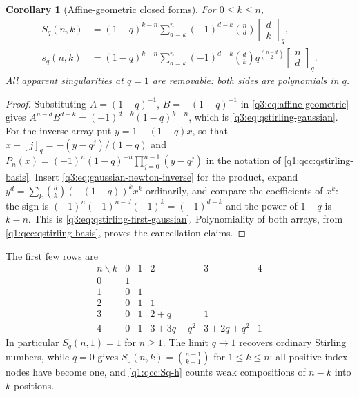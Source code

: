 \documentclass[11pt,a4paper,oneside,openany]{book}
\newtheorem{corollary}[theorem]{Corollary}
\theoremstyle{definition}
\theoremstyle{remark}
\newcommand{\GB}[3][q]{\begin{bmatrix}#2\\#3\end{bmatrix}_{#1}}
\begin{document}
\begin{corollary}[Affine-geometric closed forms]\label{q3:cor:qstirling-gaussian}
For \(0\le k\le n\),
\begin{align}
 S_q(n,k)&=(1-q)^{k-n}
       \sum_{d=k}^n(-1)^{d-k}\binom nd\GB dk,
 \label{q3:eq:qstirling-gaussian}\\
 s_q(n,k)&=(1-q)^{k-n}
 \sum_{d=k}^n(-1)^{d-k}\binom dk
        q^{\binom{n-d}2}\GB nd.
 \label{q3:eq:qstirling-first-gaussian}
\end{align}
All apparent singularities at \(q=1\) are removable: both sides are
polynomials in \(q\).
\end{corollary}
\begin{proof}
Substituting \(A=(1-q)^{-1}\), \(B=-(1-q)^{-1}\) in
\eqref{q3:eq:affine-geometric} gives
\(A^{n-d}B^{d-k}=(-1)^{d-k}(1-q)^{k-n}\), which is
\eqref{q3:eq:qstirling-gaussian}. For the inverse array put
\(y=1-(1-q)x\), so that \(x-[j]_q=-(y-q^j)/(1-q)\) and
\(P_n(x)=(-1)^n(1-q)^{-n}\prod_{j=0}^{n-1}(y-q^j)\) in the notation of
\eqref{q1:qcc:qstirling-basis}. Insert
\eqref{q3:eq:gaussian-newton-inverse} for the product, expand
\(y^d=\sum_k\binom dk(-(1-q))^kx^k\) ordinarily, and compare the
coefficients of \(x^k\): the sign is
\((-1)^{n}(-1)^{n-d}(-1)^k=(-1)^{d-k}\) and the power of \(1-q\) is
\(k-n\). This is \eqref{q3:eq:qstirling-first-gaussian}. Polynomiality of
both arrays, from \eqref{q1:qcc:qstirling-basis}, proves the cancellation
claims.
\end{proof}

The first few rows are
\begin{equation}
\begin{array}{c|lllll}
 n\backslash k&0&1&2&3&4\\\hline
 0&1\\
 1&0&1\\
 2&0&1&1\\
 3&0&1&2+q&1\\
 4&0&1&3+3q+q^2&3+2q+q^2&1
\end{array}
\label{q3:eq:qstirling-table}
\end{equation}
In particular $S_q(n,1)=1$ for $n\ge1$. The limit $q\to1$ recovers
ordinary Stirling numbers, while $q=0$ gives
$S_0(n,k)=\binom{n-1}{k-1}$ for $1\le k\le n$: all positive-index
nodes have become one, and \cref{q1:qcc:Sq-h} counts weak
compositions of $n-k$ into $k$ positions.
\end{document}
